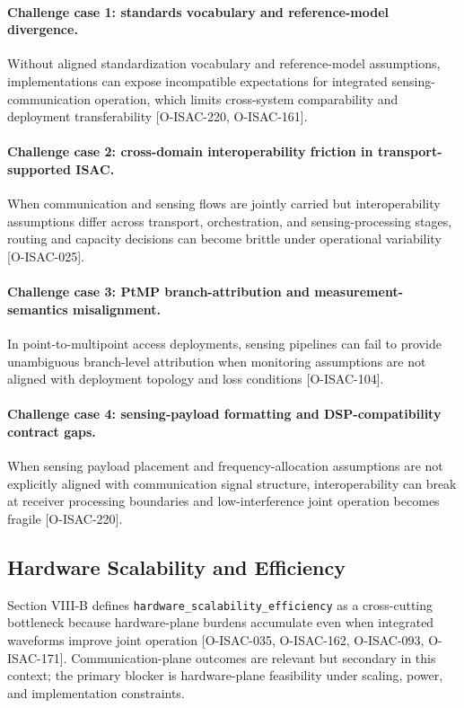 \paragraph{Challenge case 1: standards vocabulary and reference-model divergence.}
Without aligned standardization vocabulary and reference-model assumptions, implementations can expose incompatible expectations for integrated sensing-communication operation, which limits cross-system comparability and deployment transferability [O-ISAC-220, O-ISAC-161].

\paragraph{Challenge case 2: cross-domain interoperability friction in transport-supported ISAC.}
When communication and sensing flows are jointly carried but interoperability assumptions differ across transport, orchestration, and sensing-processing stages, routing and capacity decisions can become brittle under operational variability [O-ISAC-025].

\paragraph{Challenge case 3: PtMP branch-attribution and measurement-semantics misalignment.}
In point-to-multipoint access deployments, sensing pipelines can fail to provide unambiguous branch-level attribution when monitoring assumptions are not aligned with deployment topology and loss conditions [O-ISAC-104].

\paragraph{Challenge case 4: sensing-payload formatting and DSP-compatibility contract gaps.}
When sensing payload placement and frequency-allocation assumptions are not explicitly aligned with communication signal structure, interoperability can break at receiver processing boundaries and low-interference joint operation becomes fragile [O-ISAC-220].

\subsection{Hardware Scalability and Efficiency}

Section VIII-B defines \texttt{hardware\_scalability\_efficiency} as a cross-cutting bottleneck because hardware-plane burdens accumulate even when integrated waveforms improve joint operation [O-ISAC-035, O-ISAC-162, O-ISAC-093, O-ISAC-171]. Communication-plane outcomes are relevant but secondary in this context; the primary blocker is hardware-plane feasibility under scaling, power, and implementation constraints.

